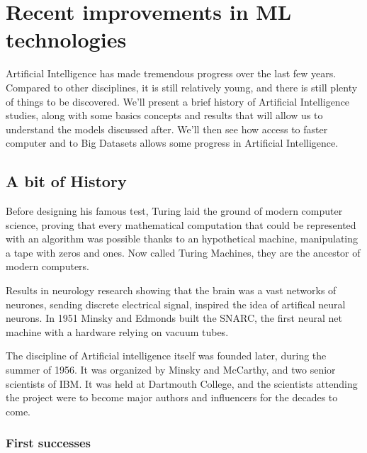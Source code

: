 \documentclass[12pt]{article}
\begin{document}
\pagebreak


\section{Recent improvements in ML technologies}

Artificial Intelligence has made tremendous progress over the last few years.
Compared to other disciplines, it is still relatively young, and there is still
plenty of things to be discovered. We'll present a brief history of Artificial
Intelligence studies, along with some basics concepts and results that will
allow us to understand the models discussed after. We'll then see how access to
faster computer and to Big Datasets allows some progress in Artificial
Intelligence.

\subsection{A bit of History}

\smallskip

Before designing his famous test, Turing laid the ground of modern computer
science, proving that every mathematical computation that could be represented
with an algorithm was possible thanks to an hypothetical machine, manipulating
a tape with zeros and ones. Now called Turing Machines, they are the ancestor
of modern computers.\cite{Turing1936}

Results in neurology research showing that the brain was a vast networks of
neurones, sending discrete electrical signal, inspired the idea of artifical
neural neurons. In 1951 Minsky and Edmonds built the SNARC, the first neural net
machine with a hardware relying on vacuum tubes.

The discipline of Artificial intelligence itself was founded later, during the
summer of 1956. It was organized by Minsky and McCarthy, and two senior
scientists of IBM. It was held at Dartmouth College, and the scientists
attending the project were to become major authors and influencers for the
decades to come. \cite{DartMouth}\\

\subsubsection{First successes}
\end{document}
